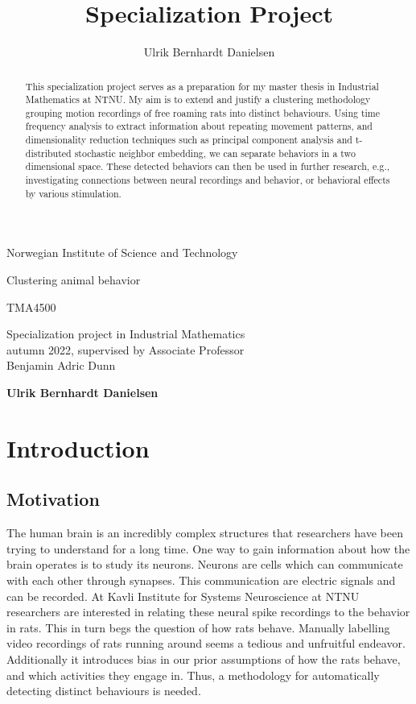 \documentclass[a4paper, 10pt]{memoir}
\title{Specialization Project}
\author{Ulrik Bernhardt Danielsen}
\theoremstyle{plain}
\theoremstyle{definition}
\theoremstyle{remark}
\newlength{\tpheight}\setlength{\tpheight}{0.9\textheight}
\newlength{\txtheight}\setlength{\txtheight}{0.9\tpheight}
\newlength{\drop}
\newcommand*{\titleMS}{\begingroup%
\drop=0.1\txtheight
\vspace*{\drop}
\centering 
{\LARGE Norwegian Institute of Science and Technology}\\[2\baselineskip]
{\LARGE\sffamily Clustering animal behavior \par}
\vfill
{\LARGE TMA4500}\par
\vspace{\drop}
{\large Specialization project in Industrial Mathematics \\
        autumn 2022, supervised by Associate Professor  \\
        Benjamin Adric Dunn\par}
\vfill
{\large\bfseries Ulrik Bernhardt Danielsen}\par
\vspace*{\drop}
\endgroup}
\begin{document}
\begin{titlingpage}
\titleMS
\end{titlingpage}

\tableofcontents*
\clearpage
\listoffigures*
\clearpage

\lhead{}
\rhead{}
\begin{abstract}
        This specialization project serves as a preparation for my master thesis in Industrial Mathematics at NTNU. 
        My aim is to extend and justify a clustering methodology grouping motion recordings of free roaming rats into distinct behaviours.
        Using time frequency analysis to extract information about repeating movement patterns, and dimensionality reduction techniques such as principal component analysis and t-distributed stochastic neighbor embedding, we can separate behaviors in a two dimensional space.
        These detected behaviors can then be used in further research, e.g., investigating connections between neural recordings and behavior, or behavioral effects by various stimulation.
\end{abstract}



\chapter{Introduction}
\lhead{\rightmark}
\rhead{\leftmark}
\section{Motivation}
The human brain is an incredibly complex structures that researchers have been trying to understand for a long time.
One way to gain information about how the brain operates is to study its neurons.
Neurons are cells which can communicate with each other through synapses.
This communication are electric signals and can be recorded.
At Kavli Institute for Systems Neuroscience at NTNU researchers are interested in relating these neural spike recordings to the behavior in rats.
This in turn begs the question of how rats behave.
Manually labelling video recordings of rats running around seems a tedious and unfruitful endeavor.
Additionally it introduces bias in our prior assumptions of how the rats behave, and which activities they engage in.
Thus, a methodology for automatically detecting distinct behaviours is needed.
\end{document}
